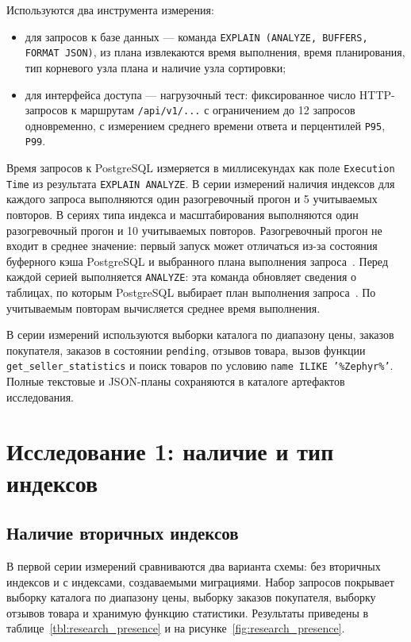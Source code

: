 Используются два инструмента измерения:

\begin{itemize}
    \item для запросов к базе данных --- команда \texttt{EXPLAIN (ANALYZE, BUFFERS, FORMAT JSON)}, из плана извлекаются время выполнения, время планирования, тип корневого узла плана и наличие узла сортировки;
    \item для интерфейса доступа --- нагрузочный тест: фиксированное число HTTP-запросов к маршрутам \texttt{/api/v1/...} с ограничением до 12 запросов одновременно, с измерением среднего времени ответа и перцентилей \texttt{P95}, \texttt{P99}.
\end{itemize}

Время запросов к PostgreSQL измеряется в миллисекундах как поле \texttt{Execution Time} из результата \texttt{EXPLAIN ANALYZE}. В серии измерений наличия индексов для каждого запроса выполняются один разогревочный прогон и 5 учитываемых повторов. В сериях типа индекса и масштабирования выполняются один разогревочный прогон и 10 учитываемых повторов. Разогревочный прогон не входит в среднее значение: первый запуск может отличаться из-за состояния буферного кэша PostgreSQL и выбранного плана выполнения запроса~\cite{postgresql_explain_doc}. Перед каждой серией выполняется \texttt{ANALYZE}: эта команда обновляет сведения о таблицах, по которым PostgreSQL выбирает план выполнения запроса~\cite{postgresql_analyze_doc}. По учитываемым повторам вычисляется среднее время выполнения.

В серии измерений используются выборки каталога по диапазону цены, заказов покупателя, заказов в состоянии \texttt{pending}, отзывов товара, вызов функции \texttt{get\_seller\_statistics} и поиск товаров по условию \texttt{name ILIKE '\%Zephyr\%'}. Полные текстовые и JSON-планы сохраняются в каталоге артефактов исследования.

\section{Исследование 1: наличие и тип индексов}

\subsection{Наличие вторичных индексов}

В первой серии измерений сравниваются два варианта схемы: без вторичных индексов и с индексами, создаваемыми миграциями. Набор запросов покрывает выборку каталога по диапазону цены, выборку заказов покупателя, выборку отзывов товара и хранимую функцию статистики. Результаты приведены в таблице~\ref{tbl:research_presence} и на рисунке~\ref{fig:research_presence}.


